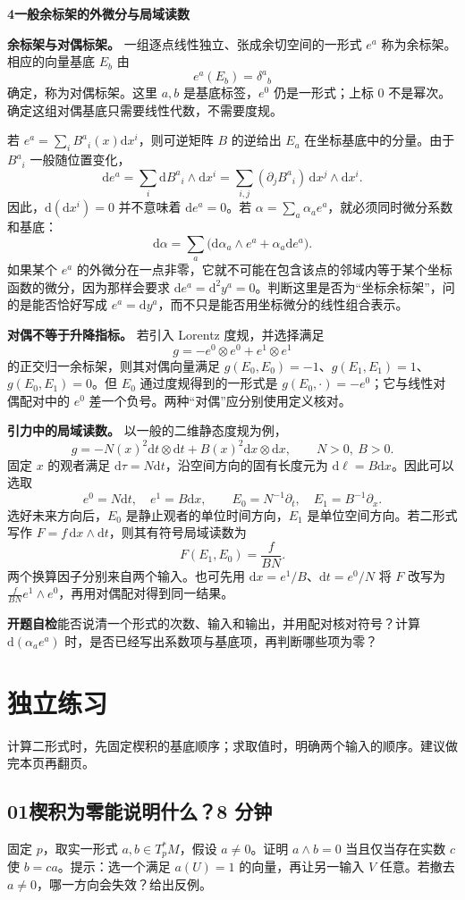 \documentclass[11pt,a4paper]{article}
\newcommand{\D}{\mathrm d}
\newcommand{\head}[1]{\section*{\color{teal}#1}}
\begin{document}
\newpage
\textbf{4\quad 一般余标架的外微分与局域读数}

\textbf{余标架与对偶标架。} 一组逐点线性独立、张成余切空间的一形式 $e^a$ 称为余标架。相应的向量基底 $E_b$ 由
\[
 e^a(E_b)=\delta^a{}_b
\]
确定，称为对偶标架。这里 $a,b$ 是基底标签，$e^0$ 仍是一形式；上标 $0$ 不是幂次。确定这组对偶基底只需要线性代数，不需要度规。

若 $e^a=\sum_i B^a{}_i(x)\D x^i$，则可逆矩阵 $B$ 的逆给出 $E_a$ 在坐标基底中的分量。由于 $B^a{}_i$ 一般随位置变化，
\[
 \D e^a=\sum_i\D B^a{}_i\wedge\D x^i
 =\sum_{i,j}(\partial_jB^a{}_i)\,\D x^j\wedge\D x^i.
\]
因此，$\D(\D x^i)=0$ 并不意味着 $\D e^a=0$。若 $\alpha=\sum_a\alpha_a e^a$，就必须同时微分系数和基底：
\[
 \boxed{\D\alpha=\sum_a\big(\D\alpha_a\wedge e^a+\alpha_a\D e^a\big).}
\]
如果某个 $e^a$ 的外微分在一点非零，它就不可能在包含该点的邻域内等于某个坐标函数的微分，因为那样会要求 $\D e^a=\D^2y^a=0$。判断这里是否为“坐标余标架”，问的是能否恰好写成 $e^a=\D y^a$，而不只是能否用坐标微分的线性组合表示。

\textbf{对偶不等于升降指标。} 若引入 Lorentz 度规，并选择满足
\[
 g=-e^0\otimes e^0+e^1\otimes e^1
\]
的正交归一余标架，则其对偶向量满足 $g(E_0,E_0)=-1$、$g(E_1,E_1)=1$、$g(E_0,E_1)=0$。但 $E_0$ 通过度规得到的一形式是 $g(E_0,\cdot)=-e^0$；它与线性对偶配对中的 $e^0$ 差一个负号。两种“对偶”应分别使用定义核对。

\textbf{引力中的局域读数。} 以一般的二维静态度规为例，
\[
 g=-N(x)^2\D t\otimes\D t+B(x)^2\D x\otimes\D x,
 \qquad N>0,\ B>0.
\]
固定 $x$ 的观者满足 $\D\tau=N\D t$，沿空间方向的固有长度元为 $\D\ell=B\D x$。因此可以选取
\[
 e^0=N\D t,\quad e^1=B\D x,
 \qquad E_0=N^{-1}\partial_t,\quad E_1=B^{-1}\partial_x.
\]
选好未来方向后，$E_0$ 是静止观者的单位时间方向，$E_1$ 是单位空间方向。若二形式写作 $F=f\,\D x\wedge\D t$，则其有符号局域读数为
\[
 F(E_1,E_0)=\frac{f}{BN}.
\]
两个换算因子分别来自两个输入。也可先用 $\D x=e^1/B$、$\D t=e^0/N$ 将 $F$ 改写为 $\frac{f}{BN}e^1\wedge e^0$，再用对偶配对得到同一结果。

\textbf{开题自检}\quad 能否说清一个形式的次数、输入和输出，并用配对核对符号？计算 $\D(\alpha_a e^a)$ 时，是否已经写出系数项与基底项，再判断哪些项为零？

\newpage
\head{独立练习}
计算二形式时，先固定楔积的基底顺序；求取值时，明确两个输入的顺序。建议做完本页再翻页。

\subsection*{01\quad 楔积为零能说明什么？\hfill 8 分钟}
固定 $p$，取实一形式 $a,b\in T_p^*M$，假设 $a\ne0$。证明 $a\wedge b=0$ 当且仅当存在实数 $c$ 使 $b=ca$。提示：选一个满足 $a(U)=1$ 的向量，再让另一输入 $V$ 任意。若撤去 $a\ne0$，哪一方向会失效？给出反例。
\end{document}
